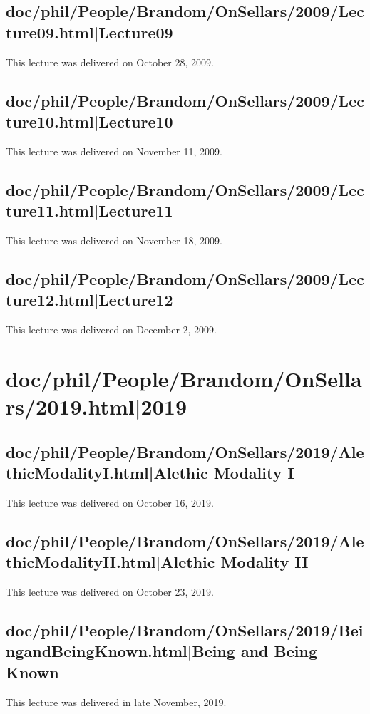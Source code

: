 \documentclass[12pt,a4paper]{report}
\begin{document}
\subsection{doc/phil/People/Brandom/OnSellars/2009/Lecture09.html|Lecture09}
This lecture was delivered on October 28, 2009.

\subsection{doc/phil/People/Brandom/OnSellars/2009/Lecture10.html|Lecture10}
This lecture was delivered on November 11, 2009.

\subsection{doc/phil/People/Brandom/OnSellars/2009/Lecture11.html|Lecture11}
This lecture was delivered on November 18, 2009.

\subsection{doc/phil/People/Brandom/OnSellars/2009/Lecture12.html|Lecture12}
This lecture was delivered on December 2, 2009.

\section{doc/phil/People/Brandom/OnSellars/2019.html|2019}

\subsection{doc/phil/People/Brandom/OnSellars/2019/AlethicModalityI.html|Alethic Modality I}
This lecture was delivered on October 16, 2019.

\subsection{doc/phil/People/Brandom/OnSellars/2019/AlethicModalityII.html|Alethic Modality II}
This lecture was delivered on October 23, 2019.

\subsection{doc/phil/People/Brandom/OnSellars/2019/BeingandBeingKnown.html|Being and Being Known}
This lecture was delivered in late November, 2019.
\end{document}
